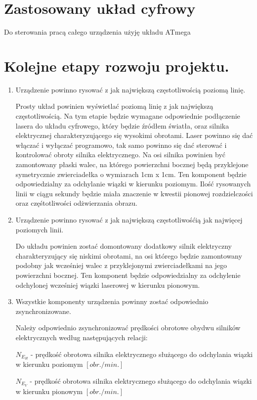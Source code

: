 \documentclass[a4paper,oneside,11pt]{report}
\begin{document}
\section{Zastosowany układ cyfrowy}
Do sterowania pracą całego urządzenia użyję układu ATmega

\section{Kolejne etapy rozwoju projektu.}
\begin{enumerate}[1.]
\item Urządzenie powinno rysować z jak największą częstotliwością poziomą linię.

Prosty układ powinien wyświetlać poziomą linię z jak największą częstotliwością. Na tym etapie będzie wymagane odpowiednie podłączenie lasera do układu cyfrowego, który będzie źródłem światła, oraz silnika elektrycznej charakteryzującego się wysokimi obrotami. Laser powinno się dać włączać i wyłączać programowo, tak samo powinno się dać sterować i kontrolować obroty silnika elektrycznego. Na osi silnika powinien być zamontowany płaski walec, na którego powierzchni bocznej będą przyklejone symetrycznie zwierciadełka o wymiarach 1cm x 1cm. Ten komponent będzie odpowiedzialny za odchylanie wiązki w kierunku poziomym. Ilość rysowanych linii w ciągu sekundy będzie miała znaczenie w kwestii pionowej rozdzielczości oraz częśtotliwości odżwierzania obrazu.

\item Urządzenie powinno rysować z jak największą częstotliwośćią jak najwięcej poziomych linii.

Do układu powinien zostać domontowany dodatkowy silnik elektryczny charakteryzujący się niskimi obrotami, na osi którego będzie zamontowany podobny jak wcześniej walec z przyklejonymi zwierciadełkami na jego powierzchni bocznej. Ten komponent będzie odpowiedzialny za odchylenie odchylonej wcześniej wiązki laserowej w kierunku pionowym.

\item Wszystkie komponenty urządzenia powinny zostać odpowiednio zsynchronizowane.

Należy odpowiednio zsynchronizować prędkości obrotowe obydwu silników elektrycznych według następujących relacji:

$N_E_H$ - prędkość obrotowa silnika elektrycznego służącego do odchylania wiązki w kierunku poziomym $[obr./min.]$

$N_E_V$ - prędkość obrotowa silnika elektrycznego służącego do odchylania wiązki w kierunku pionowym $[obr./min.]$


\end{enumerate}
\end{document}
